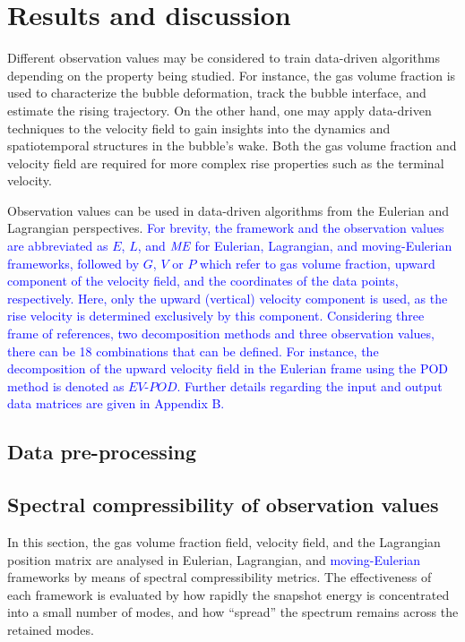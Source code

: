 \documentclass[a4paper,fleqn]{cas-sc}
\newcommand{\hl}[1]{\textcolor{blue}{#1}}
\newcommand{\hl}[1]{#1}
\begin{document}
	\section{Results and discussion}
	\label{Results and discussion}
	
	Different observation values may be considered to train data-driven algorithms depending on the property being studied. For instance, the gas volume fraction is used to characterize the bubble deformation, track the bubble interface, and estimate the rising trajectory. On the other hand, one may apply data-driven techniques to the velocity field to gain insights into the dynamics and spatiotemporal structures in the bubble's wake. Both the gas volume fraction and velocity field are required for more complex rise properties such as the terminal velocity.
	
	Observation values can be used in data-driven algorithms from the Eulerian and Lagrangian perspectives. \hl{For brevity, the framework and the observation values are abbreviated as $\textit{E}$, $\textit{L}$, and $\textit{\hl{ME}}$ for Eulerian, Lagrangian, and \hl{moving-Eulerian} frameworks, followed by $\textit{G}$, $\textit{V}$ or $P$ which refer to gas volume fraction, upward component of the velocity field, and the coordinates of the data points, respectively. Here, only the upward (vertical) velocity component is used, as the rise velocity is determined exclusively by this component. Considering three frame of references, two decomposition methods and three observation values, there can be 18 combinations that can be defined. For instance, the decomposition of the upward velocity field in the Eulerian frame using the POD method is denoted as $\textit{EV-POD}$. Further details regarding the input and output data matrices are given in Appendix B.}
	
	\subsection{Data pre-processing}
	
	\subsection{Spectral compressibility of observation values}
	In this section, the gas volume fraction field, velocity field, and the Lagrangian position matrix are analysed in Eulerian, Lagrangian, and \hl{moving-Eulerian} frameworks by means of spectral compressibility metrics. The effectiveness of each framework is evaluated by how rapidly the snapshot energy is concentrated into a small number of modes, and how ``spread'' the spectrum remains across the retained modes.
	
\end{document}
